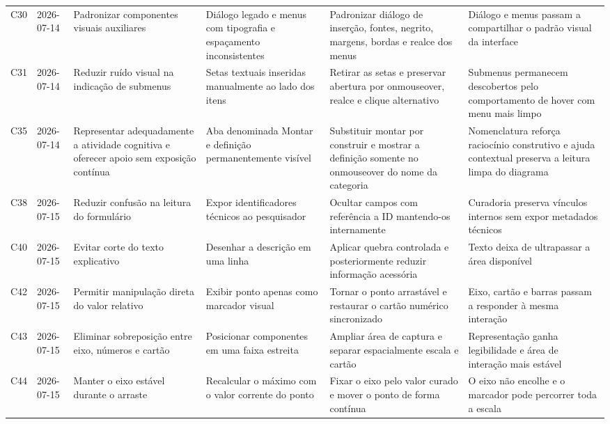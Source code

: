 \begin{landscape}
\begin{longtable}{p{1.0cm}p{1.9cm}p{4.0cm}p{5.0cm}p{6.2cm}p{5.7cm}}
\addlinespace[2pt]
C30 & 2026-07-14 & Padronizar componentes visuais auxiliares & Diálogo legado e menus com tipografia e espaçamento inconsistentes & Padronizar diálogo de inserção, fontes, negrito, margens, bordas e realce dos menus & Diálogo e menus passam a compartilhar o padrão visual da interface \\
\addlinespace[2pt]
C31 & 2026-07-14 & Reduzir ruído visual na indicação de submenus & Setas textuais inseridas manualmente ao lado dos itens & Retirar as setas e preservar abertura por onmouseover, realce e clique alternativo & Submenus permanecem descobertos pelo comportamento de hover com menu mais limpo \\
\addlinespace[2pt]
C35 & 2026-07-14 & Representar adequadamente a atividade cognitiva e oferecer apoio sem exposição contínua & Aba denominada Montar e definição permanentemente visível & Substituir montar por construir e mostrar a definição somente no onmouseover do nome da categoria & Nomenclatura reforça raciocínio construtivo e ajuda contextual preserva a leitura limpa do diagrama \\
\addlinespace[2pt]
C38 & 2026-07-15 & Reduzir confusão na leitura do formulário & Expor identificadores técnicos ao pesquisador & Ocultar campos com referência a ID mantendo-os internamente & Curadoria preserva vínculos internos sem expor metadados técnicos \\
\addlinespace[2pt]
C40 & 2026-07-15 & Evitar corte do texto explicativo & Desenhar a descrição em uma linha & Aplicar quebra controlada e posteriormente reduzir informação acessória & Texto deixa de ultrapassar a área disponível \\
\addlinespace[2pt]
C42 & 2026-07-15 & Permitir manipulação direta do valor relativo & Exibir ponto apenas como marcador visual & Tornar o ponto arrastável e restaurar o cartão numérico sincronizado & Eixo, cartão e barras passam a responder à mesma interação \\
\addlinespace[2pt]
C43 & 2026-07-15 & Eliminar sobreposição entre eixo, números e cartão & Posicionar componentes em uma faixa estreita & Ampliar área de captura e separar espacialmente escala e cartão & Representação ganha legibilidade e área de interação mais estável \\
\addlinespace[2pt]
C44 & 2026-07-15 & Manter o eixo estável durante o arraste & Recalcular o máximo com o valor corrente do ponto & Fixar o eixo pelo valor curado e mover o ponto de forma contínua & O eixo não encolhe e o marcador pode percorrer toda a escala \\

\end{longtable}
\end{landscape}
